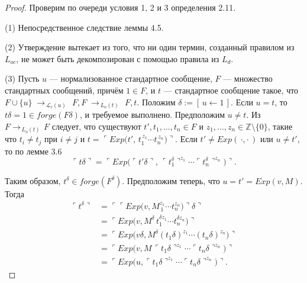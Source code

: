 \begin{proof}
Проверим по очереди условия 1, 2 и 3 определения 2.11.

(1) Непосредственное следствие леммы 4.5.

(2) Утверждение вытекает из того, что ни один термин,
созданный правилом из $L_{oc}$, не может быть
декомпозирован с помощью правила из $L_{d}$.

(3) Пусть $u$ — нормализованное стандартное сообщение,
$F$ — множество стандартных сообщений, причём $1\in F$,
и $t$ — стандартное сообщение такое, что
\(
  F\!\cup\!\{u\}\;\rightarrow_{\,\mathcal L_{c}(u)\,}\;F,
  F\;\rightarrow_{\,L_{o}(t)\,}\;F,t.
\)
Положим $\delta:=[\,u\!\leftarrow\!1\,]$.
Если $u=t$, то $t\delta=1\in forge(F\delta)$,
и требуемое выполнено.
Предположим $u\neq t$.
Из $F\rightarrow_{\,L_{o}(t)\,}F$ следует, что существуют
$t',t_{1},\dots ,t_{n}\in F$ и
$z_{1},\dots ,z_{n}\in\mathbb Z\setminus\{0\}$,
такие что $t_{i}\neq t_{j}$ при $i\neq j$ и
\(
  t=\ulcorner Exp\bigl(t',\,t_{1}^{\,z_{1}}\!\cdots t_{n}^{\,z_{n}}\bigr)\urcorner.
\)
Если $t'\neq Exp(\,\cdot,\cdot\,)$
или $u\neq t'$, то по лемме 3.6
\[
  \ulcorner t\delta \urcorner
  =
  \ulcorner Exp\bigl(\ulcorner t'\delta\urcorner,\,
        \ulcorner t_{1}^{\delta}\urcorner^{z_{1}}\!\cdots
        \ulcorner t_{n}^{\delta}\urcorner^{z_{n}}\bigr)\urcorner.
\]

Таким образом, $t^{\delta}\in forge(F^{\delta})$.
Предположим теперь, что $u=t'=Exp(v,M)$.
Тогда
\begin{align*}
\ulcorner t^{\delta} \urcorner
  &= \ulcorner\ulcorner Exp\!\bigl(v,M^{z_{1}}_{\,1}\cdots t_{n}^{z_{n}}\bigr)\urcorner\delta\urcorner\\
  &= \ulcorner Exp\!\bigl(v,M^{\delta}\,t_{1}^{\delta z_{1}}\cdots t_{n}^{\delta z_{n}}\bigr)\urcorner \tag{*}\\
  &= \ulcorner Exp\!\bigl(v\delta,M^{\delta}(t_{1}\delta)^{z_{1}}\cdots(t_{n}\delta)^{z_{n}}\bigr)\urcorner \tag{**}\\
  &= \ulcorner Exp\!\bigl(v,M\,\ulcorner t_{1}\delta\urcorner^{z_{1}}\cdots\ulcorner t_{n}\delta\urcorner^{z_{n}}\bigr)\urcorner \tag{***}\\
  &= \ulcorner Exp\!\bigl(u,\ulcorner t_{1}\delta\urcorner^{z_{1}}\cdots\ulcorner t_{n}\delta\urcorner^{z_{n}}\bigr)\urcorner.
\end{align*}


\end{proof}
